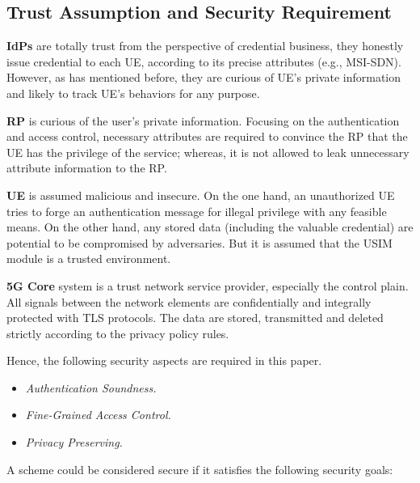 \subsection{Trust Assumption and Security Requirement}

\textbf{IdPs} are totally trust from the perspective of credential business, they honestly issue credential to each UE, according to its precise attributes (e.g., MSI-SDN). However, as has mentioned before, they are curious of UE's private information and likely to track UE's behaviors for any purpose. 

\textbf{RP} is curious of the user's private information. Focusing on the authentication and access control, necessary attributes are required to convince the RP that the UE has the privilege of the service; whereas, it is not allowed to leak unnecessary attribute information to the RP. 

\textbf{UE} is assumed malicious and insecure. On the one hand, an unauthorized UE tries to forge an authentication message for illegal privilege with any feasible means. On the other hand, any stored data (including the valuable credential) are potential to be compromised by adversaries. But it is assumed that the USIM module is a trusted environment.

\textbf{5G Core} system is a trust network service provider, especially the control plain. All signals between the network elements are confidentially and integrally protected with TLS protocols. The data are stored, transmitted and deleted strictly according to the privacy policy rules.

Hence, the following security aspects are required in this paper.

\begin{itemize}
	\item \textit{Authentication Soundness.} 
	\item \textit{Fine-Grained Access Control.}
	\item \textit{Privacy Preserving.} 
\end{itemize}

A scheme could be considered secure if it satisfies the following security goals:
